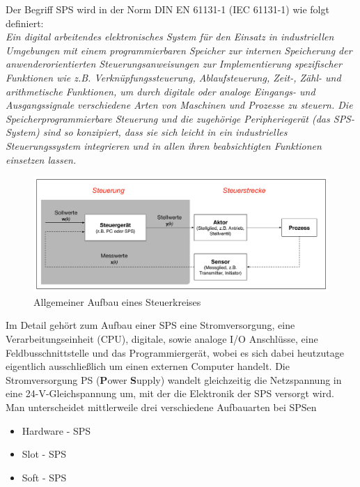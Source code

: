 	Der Begriff SPS wird in der Norm DIN EN 61131-1 (IEC 61131-1) wie folgt definiert:\\
	
	\glqq \textit{Ein digital arbeitendes elektronisches System für den Einsatz in industriellen Umgebungen mit einem programmierbaren Speicher zur internen Speicherung der anwenderorientierten Steuerungsanweisungen zur Implementierung spezifischer Funktionen wie z.B. Verknüpfungssteuerung, Ablaufsteuerung, Zeit-, Zähl- und arithmetische Funktionen, um durch digitale oder analoge Eingangs- und Ausgangssignale verschiedene Arten von Maschinen und Prozesse zu steuern. Die Speicherprogrammierbare Steuerung und die zugehörige Peripheriegerät (das SPS- System) sind so konzipiert, dass sie sich leicht in ein industrielles Steuerungssystem integrieren und in allen ihren beabsichtigten Funktionen einsetzen lassen.}\grqq \space \cite{sps_programmierung}\\
 
 	\begin{figure}[h!]
  		\centering
      	\includegraphics[width=1\textwidth]{graphics/stateoftheart/Aufbau_Steuerkreis_Selfmade.png}
  		\caption{Allgemeiner Aufbau eines Steuerkreises \cite{mseitz_sps}}
			\label{fig:Aufbau_Steuerkreis_Selfmade}
	\end{figure}	
 
 
 Im Detail gehört zum Aufbau einer SPS eine Stromversorgung, eine Verarbeitungseinheit (CPU), digitale, sowie analoge I/O Anschlüsse, eine Feldbusschnittstelle und das Programmiergerät, wobei es sich dabei heutzutage eigentlich ausschließlich um einen externen Computer handelt. Die Stromversorgung PS (\textbf{P}ower \textbf{S}upply) wandelt gleichzeitig die Netzspannung in eine 24-V-Gleichspannung um, mit der die Elektronik der SPS versorgt wird.\\
	
	Man unterscheidet mittlerweile drei verschiedene Aufbauarten bei SPSen
	
	\begin{itemize}
  		\item Hardware - SPS
  		\item Slot - SPS
  		\item Soft - SPS
	\end{itemize}

